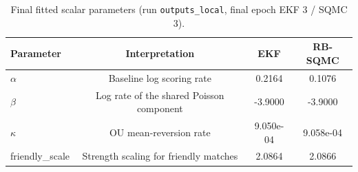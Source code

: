 \begin{table}[ht]
\centering
\caption{Final fitted scalar parameters (run \texttt{outputs\_local}, final epoch EKF 3 / SQMC 3).}
\begin{tabular}{lccc}
\toprule
Parameter & Interpretation & EKF & RB-SQMC \\
\midrule
$\alpha$ & Baseline log scoring rate & 0.2164 & 0.1076 \\
$\beta$ & Log rate of the shared Poisson component & -3.9000 & -3.9000 \\
$\kappa$ & OU mean-reversion rate & 9.050e-04 & 9.058e-04 \\
friendly\_scale & Strength scaling for friendly matches & 2.0864 & 2.0866 \\
\bottomrule
\end{tabular}
\end{table}
